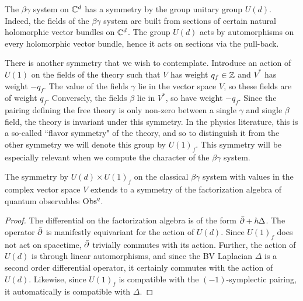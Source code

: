 \documentclass[10pt]{amsart}
\begin{document}
\subsubsection{}
The $\beta\gamma$ system on $\mathbb C^d$ has a symmetry by the group unitary group $U(d)$. 
Indeed, the fields of the $\beta\gamma$ system are built from sections of certain natural holomorphic vector bundles on $\mathbb C^d$. 
The group $U(d)$ acts by automorphisms on every holomorphic vector bundle, hence it acts on sections via the pull-back. 

There is another symmetry that we wish to contemplate. 
Introduce an action of $U(1)$ on the fields of the theory such that $V$ has weight $q_f \in \mathbb Z$ and $V^*$ has weight $-q_f$.
The value of the fields $\gamma$ lie in the vector space $V$, so these fields are of weight $q_f$. 
Conversely, the fields $\beta$ lie in $V^*$, so have weight $-q_f$.
Since the pairing defining the free theory is only non-zero between a single $\gamma$ and single $\beta$ field, the theory is invariant under this symmetry.
In the physics literature, this is a so-called ``flavor symmetry" of the theory, and so to distinguish it from the other symmetry we will denote this group by $U(1)_f$. 
This symmetry will be especially relevant when we compute the character of the $\beta \gamma$ system.

\begin{lem}\label{lem U(d) equivariance}  The symmetry by $U(d) \times U(1)_f$ on the classical $\beta\gamma$ system with values in the complex vector space $V$ extends to a symmetry of the factorization algebra of quantum observables ${\rm Obs}^q$.
\end{lem}
\begin{proof}
The differential on the factorization algebra is of the form $\Bar{\partial} + \hbar \Delta$. 
The operator $\Bar{\partial}$ is manifestly equivariant for the action of $U(d)$.
Since $U(1)_f$ does not act on spacetime, $\Bar{\partial}$ trivially commutes with its action. Further, the action of $U(d)$ is through linear automorphisms, and since the BV Laplacian $\Delta$ is a second order differential operator, it certainly commutes with the action of $U(d)$. 
Likewise, since $U(1)_f$ is compatible with the $(-1)$-symplectic pairing, it automatically is compatible with $\Delta$. 
\end{proof}
\end{document}
